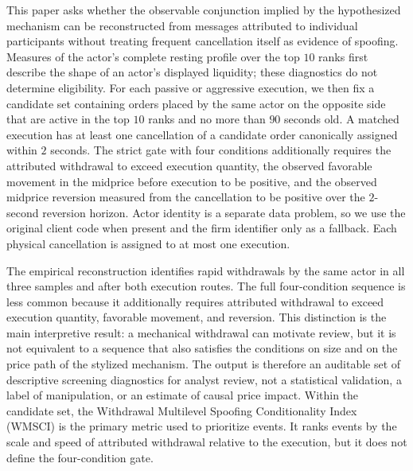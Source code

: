 \documentclass[11pt]{article}
\newenvironment{review}{\begingroup\color{blue}}{\endgroup}
\begin{document}
This paper asks whether the observable conjunction implied by the hypothesized mechanism can be reconstructed from
\begin{review}messages attributed to individual participants\end{review} without treating frequent cancellation itself as evidence of spoofing. \begin{review}Measures of the actor's complete resting profile over the top $10$ ranks\end{review} first describe the shape of an actor's displayed liquidity; these diagnostics do not determine
eligibility. For each passive or aggressive execution, we then fix \begin{review}a candidate set containing orders placed by the same actor on the opposite side\end{review} that are active in the top $10$ ranks and no more than $90$ seconds old. A matched execution has at least one cancellation
of a candidate order canonically assigned within $2$ seconds. \begin{review}The strict gate with four conditions\end{review} additionally requires the
attributed withdrawal to exceed execution quantity, \begin{review}the observed favorable movement in the midprice before execution\end{review} to be
positive, and \begin{review}the observed midprice reversion measured from the cancellation\end{review} to be positive over the $2$-second reversion horizon. Actor identity
is a separate data problem, so we use the original client code when present and the firm identifier only as a fallback. Each
physical cancellation is assigned to at most one execution.

The empirical reconstruction identifies \begin{review}rapid withdrawals by the same actor\end{review} in all three samples and after both execution routes.
The full four-condition sequence is less common because it additionally requires attributed withdrawal to exceed
execution quantity, favorable movement, and reversion. This distinction is the main interpretive result: a mechanical
withdrawal can motivate review, but it is not equivalent to a sequence that also satisfies \begin{review}the conditions on size and on the price path\end{review}
of the stylized mechanism. The output is therefore an auditable set of descriptive screening diagnostics for analyst review,
not a statistical validation, a label of manipulation, or an estimate of causal price impact. Within the candidate set, the
Withdrawal Multilevel Spoofing Conditionality Index (WMSCI) is \begin{review}the primary metric used to prioritize events\end{review}. It ranks events by the
scale and speed of attributed withdrawal relative to the execution, but it does not define the four-condition gate.
\end{document}
